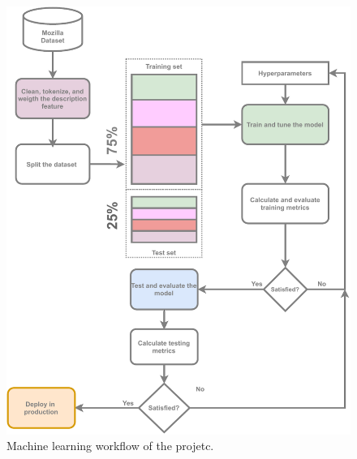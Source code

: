 \documentclass[a4paper]{article}
\begin{document}

\begin{figure}[h!]
    \centering
    \includegraphics[width=0.5\textheight]{figures/machine-learning-worflow.pdf}
    \caption{Machine learning workflow of the projetc.}
    \label{fig:machile-learning-workflow}
\end{figure}
\end{document}
